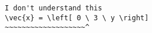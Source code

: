 \begin{verbatim}
I don't understand this
\vec{x} = \left[ 0 \ 3 \ y \right]
~~~~~~~~~~~~~~~~~~~^
\end{verbatim}
